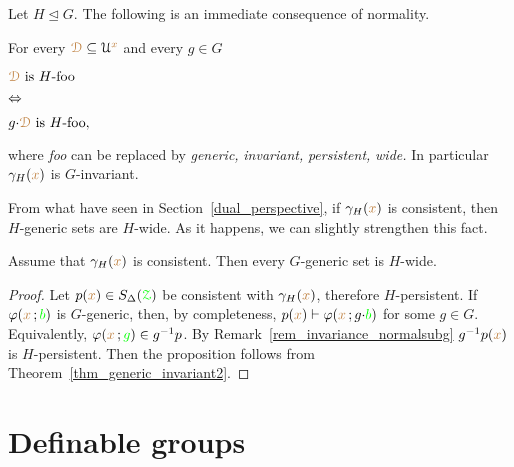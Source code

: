 Let $H\trianglelefteq G$.
The following is an immediate consequence of normality.

\begin{remark}\label{rem_invariance_normalsubg}
\newlength{\ceqlength}
\settowidth{\ceqlength}{p(x) is H-invariant\ }
\def\medrel#1{\parbox[t]{5ex}{$\displaystyle\hfil #1$}}
\def\ceq#1#2#3{\parbox[t]{\ceqlength}{$\displaystyle #1$}\medrel{#2}{$\displaystyle #3$}}
%
  For every ${\color{brown}\EuScript D}\subseteq\EuScript U^{\color{brown} x}$ and every $g\in G$
  
  \ceq{\hfill\mrD\textrm{ is }H\textrm{-foo}}{\IFF}{g{\cdot}\mrD\textrm{ is }H\textrm{-foo},}
  
  where \textit{foo\/} can be replaced by \textit{generic,} \textit{invariant,} \textit{persistent,} \textit{wide.}
  In particular $\gamma_H({\color{brown} x})$ is $G$-invariant.
\end{remark}

From what have seen in Section~\ref{dual_perspective}, if $\gamma_H({\color{brown} x})$ is consistent, then $H$-generic sets are $H$-wide. 
As it happens, we can slightly strengthen this fact.

\begin{proposition}\label{prop_Ggeneric_Hpersistent}
  Assume that $\gamma_H({\color{brown} x})$ is consistent.
  Then every $G$-generic set is $H$-wide.
\end{proposition}

\begin{proof}
  Let $p({\color{brown} x})\in S_\Delta({\color{green}\EuScript Z})$ be consistent with $\gamma_H({\color{brown} x})$, therefore $H$-persistent.
  If $\varphi({\color{brown} x}\,;{\color{green} b})$ is $G$-generic, then, by completeness, $p({\color{brown} x})\vdash\varphi({\color{brown} x}\,;g{\cdot}{\color{green} b})$ for some $g\in G$.
  Equivalently, $\varphi({\color{brown} x}\,;{\color{green} g})\in g^{-1}p$.
  By Remark~\ref{rem_invariance_normalsubg} $g^{-1}p({\color{brown} x})$ is $H$-persistent.
  Then the proposition follows from Theorem~\ref{thm_generic_invariant2}.
\end{proof}

\section{Definable groups}\label{definablegroups}

